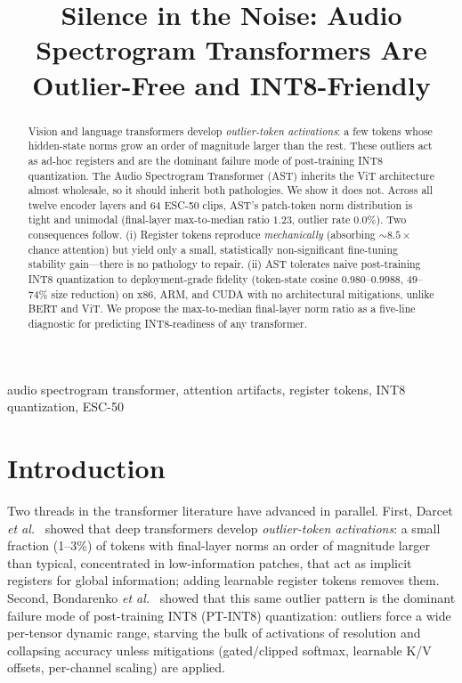 \documentclass{article}
\title{Silence in the Noise: Audio Spectrogram Transformers Are Outlier-Free and INT8-Friendly}
\begin{document}
\ninept
\maketitle

\begin{abstract}
Vision and language transformers develop \emph{outlier-token activations}: a few tokens whose hidden-state norms grow an order of magnitude larger than the rest. These outliers act as ad-hoc registers and are the dominant failure mode of post-training INT8 quantization. The Audio Spectrogram Transformer (AST) inherits the ViT architecture almost wholesale, so it should inherit both pathologies. We show it does not. Across all twelve encoder layers and 64 ESC-50 clips, AST's patch-token norm distribution is tight and unimodal (final-layer max-to-median ratio $1.23$, outlier rate $0.0\%$). Two consequences follow. (i) Register tokens reproduce \emph{mechanically} (absorbing $\sim\!8.5\times$ chance attention) but yield only a small, statistically non-significant fine-tuning stability gain---there is no pathology to repair. (ii) AST tolerates naive post-training INT8 quantization to deployment-grade fidelity (token-state cosine $0.980$--$0.9988$, $49$--$74\%$ size reduction) on x86, ARM, and CUDA with no architectural mitigations, unlike BERT and ViT. We propose the max-to-median final-layer norm ratio as a five-line diagnostic for predicting INT8-readiness of any transformer.
\end{abstract}

\begin{keywords}
audio spectrogram transformer, attention artifacts, register tokens, INT8 quantization, ESC-50
\end{keywords}

\section{Introduction}
Two threads in the transformer literature have advanced in parallel. First, Darcet \emph{et al.}~\cite{darcet2024need} showed that deep transformers develop \emph{outlier-token activations}: a small fraction (1--3\%) of tokens with final-layer norms an order of magnitude larger than typical, concentrated in low-information patches, that act as implicit registers for global information; adding learnable register tokens removes them. Second, Bondarenko \emph{et al.}~\cite{bondarenko2023quantizable} showed that this same outlier pattern is the dominant failure mode of post-training INT8 (PT-INT8) quantization: outliers force a wide per-tensor dynamic range, starving the bulk of activations of resolution and collapsing accuracy unless mitigations (gated/clipped softmax, learnable K/V offsets, per-channel scaling) are applied.
\end{document}
